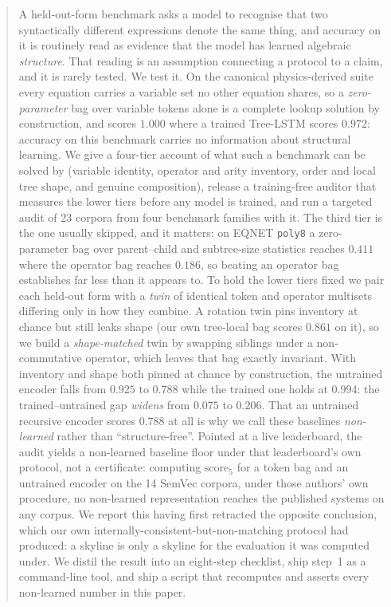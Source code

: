 \begin{abstract}
A held-out-form benchmark asks a model to recognise that two syntactically different expressions
denote the same thing, and accuracy on it is routinely read as evidence that the model has learned
algebraic \emph{structure}. That reading is an assumption connecting a protocol to a claim, and it
is rarely tested. We test it. On the canonical physics-derived suite every equation carries a
variable set no other equation shares, so a \emph{zero-parameter} bag over variable tokens alone is
a complete lookup solution by construction, and scores $1.000$ where a trained Tree-LSTM scores
$0.972$: accuracy on this benchmark carries no information about structural learning.
We give a four-tier account of what such a benchmark can be solved by (variable identity,
operator and arity inventory, order and local tree shape, and genuine composition), release a
training-free auditor that measures the lower tiers before any model is trained, and run a targeted
audit of 23 corpora from four benchmark families with it. The third tier is the one usually skipped, and it matters: on EQNET
\texttt{poly8} a zero-parameter bag over parent--child and subtree-size statistics reaches $0.411$
where the operator bag reaches $0.186$, so beating an operator bag establishes far less than it
appears to. To hold the lower tiers fixed we pair each held-out form with a \emph{twin} of identical
token and operator multisets differing only in how they combine. A rotation twin pins inventory at
chance but still leaks shape (our own tree-local bag scores $0.861$ on it), so we build a
\emph{shape-matched} twin by swapping siblings under a non-commutative operator, which leaves that
bag exactly invariant. With inventory and shape both pinned at chance by construction, the untrained
encoder falls from $0.925$ to $0.788$ while the trained one holds at $0.994$: the trained--untrained
gap \emph{widens} from $0.075$ to $0.206$. That an untrained recursive encoder
scores $0.788$ at all is why we call these baselines \emph{non-learned} rather than
``structure-free''.
Pointed at a live leaderboard, the audit yields a non-learned baseline floor under that leaderboard's own protocol, not a certificate: computing
$\mathrm{score}_5$ for a token bag and an untrained encoder on the 14 SemVec corpora, under those
authors' own procedure, no non-learned representation reaches the published systems on any corpus. We report this having
first retracted the opposite conclusion, which our own internally-consistent-but-non-matching
protocol had produced: a skyline is only a skyline for the evaluation it was computed under.
We distil the result into an eight-step checklist, ship step~1 as a command-line tool, and ship a
script that recomputes and asserts every non-learned number in this paper.
\end{abstract}
